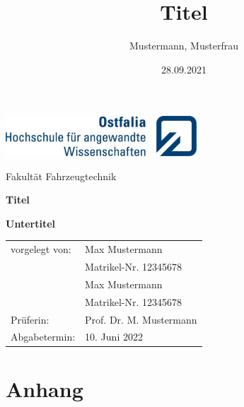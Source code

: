 \documentclass[chapterprefix=false, 11pt]{scrreprt}
\title{Titel}
\author{Mustermann, Musterfrau}
\date{28.09.2021}
\begin{document}
\sffamily

\begin{titlepage}
    
    \begin{flushright}
        \includegraphics[height=1.5cm]{Ostfalia Logo.jpg}
    \end{flushright}
    
    \vspace{2cm}

    \begin{centering}
        
        {\large Fakultät Fahrzeugtechnik\par}
	    
        \vspace{1.5cm}
	    
        {\huge\bfseries Titel\par}
        
        \vspace{1cm}
        
        {\Large\bfseries Untertitel\par}

    \end{centering}
    
    \vfill
    
    \begin{tabular}{ p{4cm} p{10cm} }
        
        vorgelegt von:  & Max Mustermann          \\
                        & Matrikel-Nr. 12345678   \\[0.25cm]
                        & Max Mustermann          \\
                        & Matrikel-Nr. 12345678   \\[0.5cm]
        Prüferin:       & Prof. Dr. M. Mustermann \\[0.5cm]
        Abgabetermin:   & 10. Juni 2022           \\
    
    \end{tabular}

\end{titlepage}

{

    \tableofcontents
        
        
    \pagebreak
}

{
    \listoffigures
        
        
    \pagebreak
}






{
    \appendix
    \chapter{Anhang}
    
    
}
\end{document}
